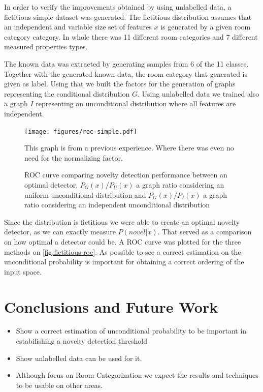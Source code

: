 \documentclass[runningheads,a4paper]{llncs}
\begin{document}
In order to verify the improvements obtained by using unlabelled data, a fictitious simple dataset was generated.
The fictitious distribution assumes that an independent and variable size set of features $x$ is generated by a
given room category category. In whole there was 11 different room categories and 7 different measured properties types.

The known data was extracted by generating samples from 6 of the 11 classes. Together with the generated known data, the
room category that generated is given as label. Using that we built the factors for the generation of graphs representing
the conditional distribution $G$.
Using unlabelled data we trained also a graph $I$ representing an unconditional distribution where all features are independent.

\begin{figure}[h!]
\centering
\texttt{[image: figures/roc-simple.pdf]}

This graph is from a previous experience. Where there was even no need for the normalizing factor.

\caption{\label{fig:fictitious-roc}ROC curve comparing novelty detection performance between an optimal detector,
         $P_G(x)/P_U(x)$ a graph ratio considering an uniform unconditional distribution and
         $P_G(x)/P_I(x)$ a graph ratio considering an independent unconditional distribution}
\end{figure}

Since the distribution is fictitious we were able to create an optimal novelty detector, as we can exactly measure $P(novel|x)$.
That served as a comparison on how optimal a detector could be.
A ROC curve was plotted for the three methods on \autoref{fig:fictitious-roc}.
As possible to see a correct estimation on the unconditional probability is important for obtaining a correct ordering of the
input space.






\section{Conclusions and Future Work}
\begin{itemize}
\item Show a correct estimation of unconditional probability to be important in estabilishing a novelty detection threshold
\item Show unlabelled data can be used for it.
\item Although focus on Room Categorization we expect the results and techniques to be usable on other areas.
\end{itemize}



\end{document}
